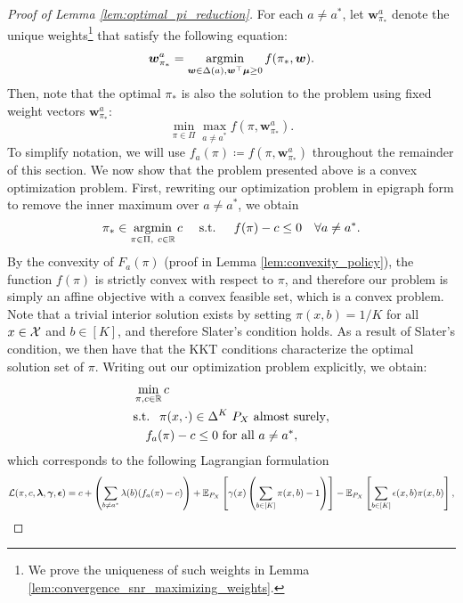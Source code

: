 \documentclass{article}
\begin{document}
\begin{appendices}
\begin{proof}[Proof of Lemma \ref{lem:optimal_pi_reduction}]
    For each $a\neq a^*$, let $\bm{w}_{\pi_*}^a$ denote the unique weights\footnote{We prove the uniqueness of such weights in Lemma \ref{lem:convergence_snr_maximizing_weights}.} that satisfy the following equation:
    \begin{equation}
        \bm{w}_{\pi_*}^a = \argmin_{\bm{w} \in \Delta(a), \bm{w}^\top \bm{\mu}\geq 0} f(\pi_*, \bm{w}).
    \end{equation}
    Then, note that the optimal $\pi_*$ is also the solution to the problem using fixed weight vectors $\bm{w}_{\pi_*}^a$:
    \begin{equation}
        \min_{\pi \in \Pi}\max_{a \neq a^*} f(\pi, \bm{w}_{\pi_*}^a).
    \end{equation}
    To simplify notation, we will use $f_a(\pi) \coloneqq f(\pi, \bm{w}_{\pi_*}^a)$ throughout the remainder of this section. We now show that the problem presented above is a convex optimization problem. First, rewriting our optimization problem in epigraph form to remove the inner maximum over $a \neq a^*$, we obtain
    \begin{align}
        \pi_* \in \argmin_{\pi \in \Pi, \  c \in \RR} c  \quad \text{ s.t. } \quad f(\pi)-c \leq 0  \quad \forall a \neq a^*.
    \end{align}
    By the convexity of $F_a(\pi)$ (proof in Lemma \ref{lem:convexity_policy}), the function $f(\pi)$ is strictly convex with respect to $\pi$, and therefore our problem is simply an affine objective with a convex feasible set, which is a convex problem. Note that a trivial interior solution exists by setting $\pi(x,b) = 1/K$ for all $x\in \mathcal{X}$ and $b \in [K]$, and therefore Slater's condition holds. As a result of Slater's condition, we then have that the KKT conditions characterize the optimal solution set of $\pi$. Writing out our optimization problem explicitly, we obtain:
    \begin{align}
        &\min_{\pi, c \in \mathbb{R}} c \\
        & \text{s.t. } \ \pi(x,\cdot) \in \Delta^K \ P_X\text{ almost surely}, \\
        &\quad f_a(\pi) - c \leq 0  \text{ for all } a \neq a^*,\label{l:norm_constraint}
    \end{align}
    which corresponds to the following Lagrangian formulation
    \begin{equation}
        \Lcal(\pi, c, \bm{\lambda}, \bm{\gamma}, \bm{\epsilon}) = c + \left(\sum_{b \neq a^*} \lambda(b)(f_a(\pi)- c)\right)+ \EE_{P_X}\left[\gamma(x) \left( \sum_{b \in [K]}\pi(x,b) - 1\right) \right] - \EE_{P_X}\left[ \sum_{b \in [K]}\epsilon(x,b) \pi(x,b)  \right],

\end{equation}
\end{proof}
\end{appendices}
\end{document}
